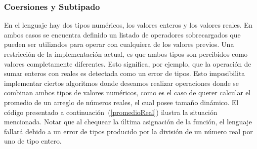 \begin{itemize}
\iffalse
Otra opción, es rediseñar los chequeos estáticos actuales para realizar más de una recorrida al \textit{árbol de sintaxis abstracta}.
La idea es que en una primera pasada, se puedan analizar todos los prototipos de las definiciones de tipo, y las declaraciones de funciones y procedimientos del programa.
Una vez finalizado este análisis, se deberá realizar una segunda pasada donde esta vez se deberán verificar los cuerpos de las construcciones anteriormente mencionadas.
De esta manera, se pueden acumular la totalidad de errores encontrados en una de estas fases, antes de abortar el análisis del programa con un mensaje de error.
Comparada con la técnica anterior, la opción actual resulta mucha más compleja y necesita modificar gran parte de la implementación.
A pesar de esto, la misma aprovecha la idea que los prototipos son válidos de forma mutuamente independiente entre ellos, al igual que como ocurre con sus respectivos cuerpos.
Otra ventaja de la técnica actual sobre la opción anterior, es que la misma permitiría invocar funciones y procedimientos sin importar el lugar espacial donde hayan sido declaradas.
Incluso se admitiría la posibilidad de definir de forma mutua las construcciones previamente mencionadas.
\fi

\end{itemize}

\subsubsection{Coersiones y Subtipado}

En el lenguaje hay dos tipos numéricos, los valores enteros y los valores reales.
En ambos casos se encuentra definido un listado de operadores sobrecargados que pueden ser utilizados para operar con cualquiera de los valores previos.
Una restricción de la implementación actual, es que ambos tipos son percibidos como valores completamente diferentes.
Esto significa, por ejemplo, que la operación de sumar enteros con reales es detectada como un error de tipos.
Esto imposibilita implementar ciertos algoritmos donde deseamos realizar operaciones donde se combinan ambos tipos de valores numéricos, como es el caso de querer calcular el promedio de un arreglo de números reales, el cual posee tamaño dinámico.
El código presentado a continuación~(\ref{promedioReal}) ilustra la situación mencionada.
Notar que al chequear la última asignación de la función, el lenguaje fallará debido a un error de tipos producido por la división de un número real por uno de tipo entero.

